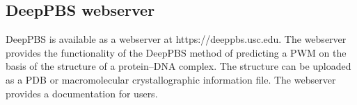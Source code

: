\subsection{DeepPBS webserver}
DeepPBS is available as a webserver at https://deeppbs.usc.edu. The webserver provides the functionality of the DeepPBS method of predicting a PWM on the basis of the structure of a protein–DNA complex. The structure can be uploaded as a PDB or macromolecular crystallographic information file. The webserver provides a documentation for users.
